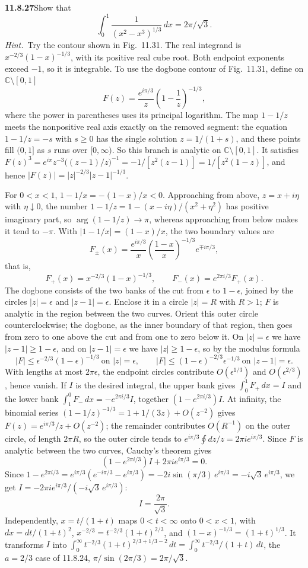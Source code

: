 \par\bigskip
\noindent\textbf{11.8.27}\quad Show that
\[
\int_{0}^{1}\frac{1}{(x^{2}-x^{3})^{1/3}}\,dx=2\pi/\sqrt{3}.
\]
\emph{Hint.}~Try the contour shown in Fig.~11.31.
\solution
The real integrand is $x^{-2/3}(1-x)^{-1/3}$, with its positive
real cube root. Both endpoint exponents exceed $-1$, so it is
integrable. To use the dogbone contour of Fig.~11.31, define on
$\mathbb C\setminus[0,1]$
\[
F(z)=\frac{e^{i\pi/3}}{z}
\left(1-\frac1z\right)^{-1/3},
\]
where the power in parentheses uses its principal logarithm.
The map $1-1/z$ meets the nonpositive real axis exactly on the
removed segment: the equation $1-1/z=-s$ with $s\ge0$ has the single
solution $z=1/(1+s)$, and these points fill $(0,1]$ as $s$ runs over
$[0,\infty)$. So this branch is analytic on $\mathbb C\setminus[0,1]$.
It satisfies
$F(z)^3=e^{i\pi}z^{-3}\bigl((z-1)/z\bigr)^{-1}=-1/[z^2(z-1)]
=1/[z^2(1-z)]$, and hence $|F(z)|=|z|^{-2/3}|z-1|^{-1/3}$.

For $0<x<1$, $1-1/x=-(1-x)/x<0$. Approaching from above,
$z=x+i\eta$ with $\eta\downarrow0$, the number
$1-1/z=1-(x-i\eta)/(x^2+\eta^2)$ has positive imaginary part, so
$\arg(1-1/z)\to\pi$, whereas approaching from below makes it
tend to $-\pi$. With $|1-1/x|=(1-x)/x$, the two boundary values are
\[
F_\pm(x)=\frac{e^{i\pi/3}}{x}\left(\frac{1-x}{x}\right)^{-1/3}
e^{\mp i\pi/3},
\]
that is,
\[
F_+(x)=x^{-2/3}(1-x)^{-1/3},\qquad
F_-(x)=e^{2\pi i/3}F_+(x).
\]
The dogbone consists of the two banks of the cut from $\epsilon$ to
$1-\epsilon$, joined by the circles $|z|=\epsilon$ and
$|z-1|=\epsilon$. Enclose it in a circle $|z|=R$ with $R>1$; $F$ is
analytic in the region between the two curves. Orient this outer
circle counterclockwise; the dogbone, as the inner boundary of that
region, then goes from zero to one above the cut and from one to
zero below it. On $|z|=\epsilon$ we have $|z-1|\ge1-\epsilon$, and on
$|z-1|=\epsilon$ we have $|z|\ge1-\epsilon$, so by the modulus formula
\[
|F|\le\epsilon^{-2/3}(1-\epsilon)^{-1/3}\ \text{on }|z|=\epsilon,
\qquad
|F|\le(1-\epsilon)^{-2/3}\epsilon^{-1/3}\ \text{on }|z-1|=\epsilon.
\]
With lengths at most $2\pi\epsilon$, the endpoint circles contribute
$O(\epsilon^{1/3})$ and $O(\epsilon^{2/3})$, hence vanish.
If $I$ is the desired integral, the upper bank gives
$\int_0^1F_+\,dx=I$ and the lower bank
$\int_1^0F_-\,dx=-e^{2\pi i/3}I$, together $(1-e^{2\pi i/3})I$.
At infinity, the binomial series
$(1-1/z)^{-1/3}=1+1/(3z)+O(z^{-2})$ gives
$F(z)=e^{i\pi/3}/z+O(z^{-2})$; the remainder contributes $O(R^{-1})$
on the outer circle, of length $2\pi R$, so the outer circle tends to
$e^{i\pi/3}\oint dz/z=2\pi i e^{i\pi/3}$. Since $F$ is analytic
between the two curves, Cauchy's theorem gives
\[
(1-e^{2\pi i/3})I+2\pi i e^{i\pi/3}=0.
\]
Since $1-e^{2\pi i/3}=e^{i\pi/3}(e^{-i\pi/3}-e^{i\pi/3})
=-2i\sin(\pi/3)\,e^{i\pi/3}=-i\sqrt3\,e^{i\pi/3}$, we get
$I=-2\pi ie^{i\pi/3}/(-i\sqrt3\,e^{i\pi/3})$:
\[
\boxed{I=\frac{2\pi}{\sqrt3}}.
\]
Independently, $x=t/(1+t)$ maps $0<t<\infty$ onto $0<x<1$, with
$dx=dt/(1+t)^2$, $x^{-2/3}=t^{-2/3}(1+t)^{2/3}$, and
$(1-x)^{-1/3}=(1+t)^{1/3}$. It transforms $I$ into
$\int_0^\infty t^{-2/3}(1+t)^{2/3+1/3-2}\,dt
=\int_0^\infty t^{-2/3}/(1+t)\,dt$, the $a=2/3$ case of 11.8.24,
$\pi/\sin(2\pi/3)=2\pi/\sqrt3$.


